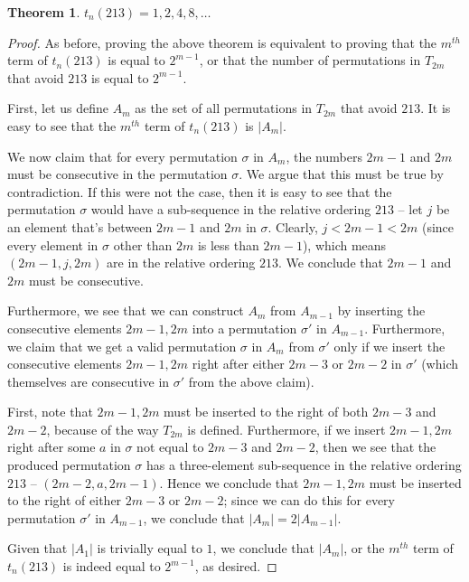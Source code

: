 \documentclass[11pt,letterpaper,twoside,english]{article}
\theoremstyle{theorem}
\newtheorem{theorem}{Theorem}
\theoremstyle{remark}
\begin{document}
\begin{theorem}
$t_n(213) = 1, 2, 4, 8, \ldots$
\end{theorem}

\begin{proof}
As before, proving the above theorem is equivalent to proving that the $m^{th}$ term of $t_n(213)$ is equal to $2^{m-1}$, or that the number of permutations in $T_{2m}$ that avoid $213$ is equal to $2^{m-1}$.

First, let us define $A_m$ as the set of all permutations in $T_{2m}$ that avoid $213$. It is easy to see that the $m^{th}$ term of $t_n(213)$ is $|A_m|$.

We now claim that for every permutation $\sigma$ in $A_m$, the numbers $2m-1$ and $2m$ must be consecutive in the permutation $\sigma$. We argue that this must be true by contradiction. If this were not the case, then it is easy to see that the permutation $\sigma$ would have a sub-sequence in the relative ordering $213$ -- let $j$ be an element that's between $2m-1$ and $2m$ in $\sigma$. Clearly, $j < 2m -1 < 2m$ (since every element in $\sigma$ other than $2m$ is less than $2m-1$), which means $(2m - 1, j, 2m)$ are in the relative ordering $213$. We conclude that $2m-1$ and $2m$ must be consecutive.

Furthermore, we see that we can construct $A_m$ from $A_{m-1}$ by inserting the consecutive elements $2m-1, 2m$ into a permutation $\sigma'$ in $A_{m-1}$. Furthermore, we claim that we get a valid permutation $\sigma$ in $A_m$ from $\sigma'$ only if we insert the consecutive elements $2m-1, 2m$ right after either $2m-3$ or $2m-2$ in $\sigma'$ (which themselves are consecutive in $\sigma'$ from the above claim).

First, note that $2m-1, 2m$ must be inserted to the right of both $2m-3$ and $2m-2$, because of the way $T_{2m}$ is defined. Furthermore, if we insert $2m-1, 2m$ right after some $a$ in $\sigma$ not equal to $2m-3$ and $2m-2$, then we see that the produced permutation $\sigma$ has a three-element sub-sequence in the relative ordering $213$ -- $(2m-2, a, 2m-1)$. Hence we conclude that $2m-1, 2m$ must be inserted to the right of either $2m-3$ or $2m-2$; since we can do this for every permutation $\sigma'$ in $A_{m-1}$, we conclude that $|A_m| = 2|A_{m-1}|$.

Given that $|A_1|$ is trivially equal to $1$, we conclude that $|A_m|$, or the $m^{th}$ term of $t_n(213)$ is indeed equal to $2^{m-1}$, as desired.
\end{proof}
\end{document}

